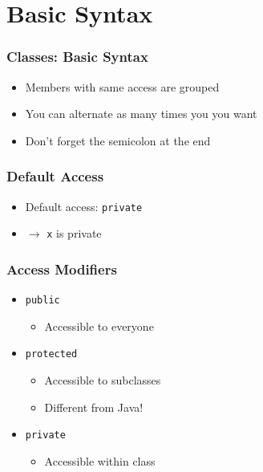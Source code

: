 \section{Basic Syntax}
\frame{\tableofcontents[currentsection]}

\begin{frame}
  \frametitle{Classes: Basic Syntax}
  \begin{overprint}
    \begin{itemize}
      \item Members with same access are grouped
      \item You can alternate as many times you you want
    \end{itemize}

    \begin{itemize}
      \item Don't forget the semicolon at the end
    \end{itemize}
  \end{overprint}
\end{frame}

\begin{frame}
  \frametitle{Default Access}
  \begin{itemize}
    \item Default access: \texttt{private}
    \item $\rightarrow$ \texttt{x} is private
  \end{itemize}
\end{frame}

\begin{frame}
  \frametitle{Access Modifiers}
  \begin{itemize}
    \item \texttt{public}
          \begin{itemize}
            \item Accessible to everyone
          \end{itemize}
    \item \texttt{protected}
          \begin{itemize}
            \item Accessible to subclasses
            \item Different from Java!
          \end{itemize}
    \item \texttt{private}
          \begin{itemize}
            \item Accessible within class
          \end{itemize}
  \end{itemize}
\end{frame}

